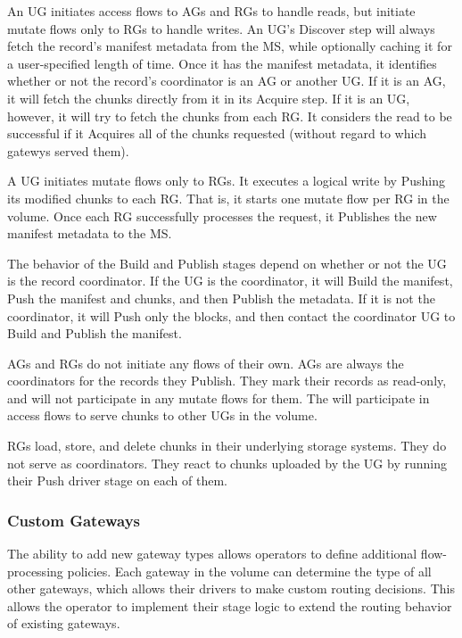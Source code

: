 An UG initiates access flows to AGs and RGs to handle reads, but initiate mutate
flows only to RGs to handle writes.  An UG's Discover step will always fetch the
record's manifest metadata from the MS, while optionally caching it for a
user-specified length of time.  Once it has the manifest metadata, it identifies
whether or not the record's coordinator is an AG or another UG.   If it is an
AG, it will fetch the chunks directly from it in its Acquire step.  If it is an
UG, however, it will try to fetch the chunks from each RG.  It considers the
read to be successful if it Acquires all of the chunks requested (without regard
to which gatewys served them).

A UG initiates mutate flows only to RGs.  It executes a logical write by Pushing
its modified chunks to each RG.  That is, it starts one mutate flow per RG in
the volume.  Once each RG successfully processes the request, it Publishes the
new manifest metadata to the MS.

The behavior of the Build and Publish stages depend on whether or not the UG is
the record coordinator.  If the UG is the coordinator, it will Build the
manifest, Push the manifest and chunks, and then Publish the metadata.  If it is
not the coordinator, it will Push only the blocks, and then
contact the coordinator UG to Build and Publish the manifest.

AGs and RGs do not initiate any flows of
their own.  AGs are always the coordinators for the records they Publish.  They mark their
records as read-only, and will not participate in any mutate flows for them.
The will participate in access flows to serve chunks to other UGs in the volume.

RGs load, store, and delete chunks in their underlying storage systems.  They do
not serve as coordinators.  They react to chunks uploaded by the UG by running
their Push driver stage on each of them.

\subsubsection{Custom Gateways}

The ability to add new gateway types allows operators to define additional
flow-processing policies.  Each gateway in the volume can determine the type of
all other gateways, which allows their drivers to make custom routing decisions.
This allows the operator to implement their stage logic to extend the
routing behavior of existing gateways.

